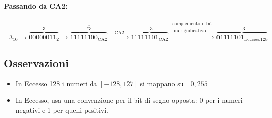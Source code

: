 \paragraph{Passando da CA2:}
\[
-3_{10} 
\longrightarrow \overbrace{00000011_2}^{3} 
\longrightarrow \overbrace{11111100_{\text{CA2}}}^{\bar{*3}} 
\xrightarrow{\quad\text{CA2}\quad} \overbrace{11111101_{\text{CA2}}}^{-3} 
\xrightarrow{\substack{\text{complemento il bit}\\\text{più significativo}}} \overbrace{\mathbf{0}1111101_{\text{Eccesso}128}}^{-3}
\]

\subsection{Osservazioni}

\begin{itemize}
    \item In Eccesso 128 i numeri da $[-128, 127]$ si mappano su $[0, 255]$
    \item In Eccesso, usa una convenzione per il bit di segno opposta: 0 per i numeri negativi e 1 per quelli positivi.
\end{itemize}